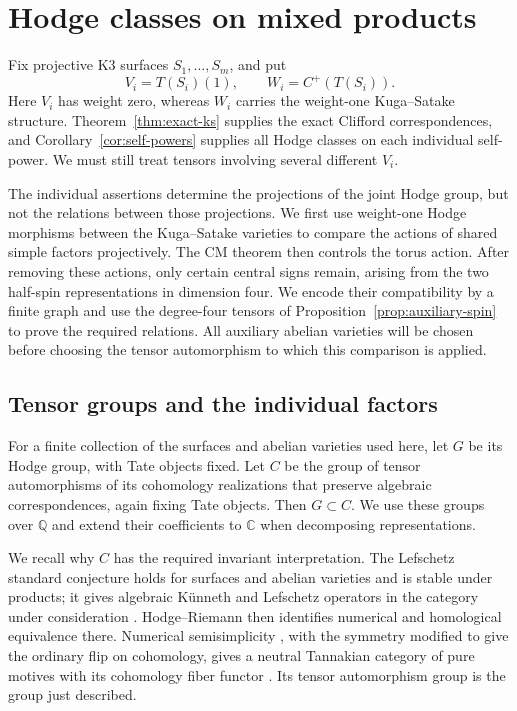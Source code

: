 \documentclass[11pt]{article}
\numberwithin{equation}{section}
\theoremstyle{definition}
\theoremstyle{remark}
\newcommand{\Q}{\mathbb Q}
\newcommand{\C}{\mathbb C}
\begin{document}
\section{Hodge classes on mixed products}\label{sec:mixed}

Fix projective K3 surfaces $S_1,\ldots,S_m$, and put
\[
 V_i=T(S_i)(1),\qquad W_i=C^+(T(S_i)).
\]
Here $V_i$ has weight zero, whereas $W_i$ carries the weight-one
Kuga--Satake structure.  Theorem~\ref{thm:exact-ks} supplies the exact
Clifford correspondences, and Corollary~\ref{cor:self-powers} supplies all
Hodge classes on each individual self-power.  We must still treat tensors
involving several different $V_i$.

The individual assertions determine the projections of the joint Hodge
group, but not the relations between those projections.  We first use
weight-one Hodge morphisms between the Kuga--Satake varieties to compare
the actions of shared simple factors projectively.  The CM theorem then
controls the torus action.  After removing these actions, only certain
central signs remain, arising from the two half-spin representations in
dimension four.  We encode their compatibility by a finite graph and use
the degree-four tensors of Proposition~\ref{prop:auxiliary-spin} to prove
the required relations.  All auxiliary abelian varieties will be chosen
before choosing the tensor automorphism to which this comparison is
applied.

\subsection{Tensor groups and the individual factors}

For a finite collection of the surfaces and abelian varieties used here,
let $G$ be its Hodge group, with Tate objects fixed.  Let $C$ be the group
of tensor automorphisms of its cohomology realizations that preserve
algebraic correspondences, again fixing Tate objects.  Then $G\subset C$.
We use these groups over $\Q$ and extend their coefficients to $\C$ when
decomposing representations.

We recall why $C$ has the required invariant interpretation.  The
Lefschetz standard conjecture holds for surfaces and abelian varieties
and is stable under products; it gives algebraic K\"unneth and Lefschetz
operators in the category under consideration
\cite{KleimanStandard}.  Hodge--Riemann then identifies numerical and
homological equivalence there.  Numerical semisimplicity
\cite{JannsenMotives}, with the symmetry modified to give the ordinary
flip on cohomology, gives a neutral Tannakian category of pure motives
with its cohomology fiber functor \cite{DeligneMilneTannakian}.
Its tensor automorphism group is the group just described.
\end{document}
